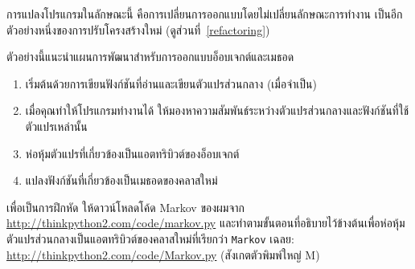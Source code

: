 การแปลงโปรแกรมในลักษณะนี้ คือการเปลี่ยนการออกแบบโดยไม่เปลี่ยนลักษณะการทำงาน เป็นอีกตัวอย่างหนึ่งของการปรับโครงสร้างใหม่ (ดูส่วนที่~\ref{refactoring})



ตัวอย่างนี้แนะนำแผนการพัฒนาสำหรับการออกแบบอ็อบเจกต์และเมธอด

\begin{enumerate}

\item เริ่มต้นด้วยการเขียนฟังก์ชันที่อ่านและเขียนตัวแปรส่วนกลาง (เมื่อจำเป็น)

\item เมื่อคุณทำให้โปรแกรมทำงานได้ ให้มองหาความสัมพันธ์ระหว่างตัวแปรส่วนกลางและฟังก์ชันที่ใช้ตัวแปรเหล่านั้น

\item ห่อหุ้มตัวแปรที่เกี่ยวข้องเป็นแอตทริบิวต์ของอ็อบเจกต์

\item แปลงฟังก์ชันที่เกี่ยวข้องเป็นเมธอดของคลาสใหม่

\end{enumerate}


เพื่อเป็นการฝึกหัด ให้ดาวน์โหลดโค้ด Markov ของผมจาก \url{http://thinkpython2.com/code/markov.py} 
และทำตามขั้นตอนที่อธิบายไว้ข้างต้นเพื่อห่อหุ้มตัวแปรส่วนกลางเป็นแอตทริบิวต์ของคลาสใหม่ที่เรียกว่า {\tt Markov} 
เฉลย: \url{http://thinkpython2.com/code/Markov.py} (สังเกตตัวพิมพ์ใหญ่ M)


